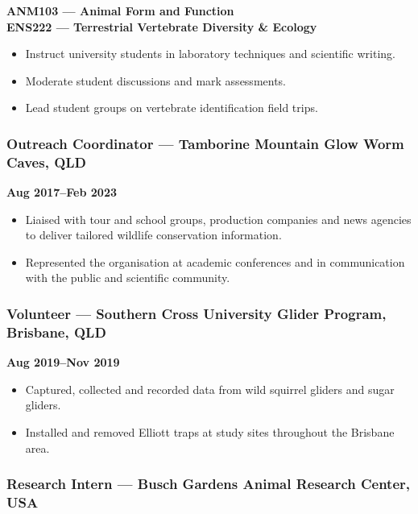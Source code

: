 \documentclass[
]{article}
\providecommand{\tightlist}{%
  \setlength{\itemsep}{0pt}\setlength{\parskip}{0pt}}
\begin{document}
\textbf{ANM103 --- Animal Form and Function}\\
\textbf{ENS222 --- Terrestrial Vertebrate Diversity \& Ecology}

\begin{itemize}
\tightlist
\item
  Instruct university students in laboratory techniques and scientific
  writing.
\item
  Moderate student discussions and mark assessments.
\item
  Lead student groups on vertebrate identification field trips.
\end{itemize}

\subsubsection{Outreach Coordinator --- Tamborine Mountain Glow Worm
Caves,
QLD}\label{outreach-coordinator-tamborine-mountain-glow-worm-caves-qld}

\textbf{Aug 2017--Feb 2023}

\begin{itemize}
\tightlist
\item
  Liaised with tour and school groups, production companies and news
  agencies to deliver tailored wildlife conservation information.
\item
  Represented the organisation at academic conferences and in
  communication with the public and scientific community.
\end{itemize}

\subsubsection{Volunteer --- Southern Cross University Glider Program,
Brisbane,
QLD}\label{volunteer-southern-cross-university-glider-program-brisbane-qld}

\textbf{Aug 2019--Nov 2019}

\begin{itemize}
\tightlist
\item
  Captured, collected and recorded data from wild squirrel gliders and
  sugar gliders.
\item
  Installed and removed Elliott traps at study sites throughout the
  Brisbane area.
\end{itemize}

\subsubsection{Research Intern --- Busch Gardens Animal Research Center,
USA}\label{research-intern-busch-gardens-animal-research-center-usa}
\end{document}
